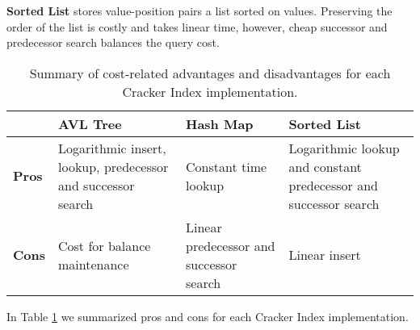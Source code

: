 \textbf{Sorted List} stores value-position pairs a list sorted on values. Preserving the order of the list is costly and takes linear time, however, cheap successor and predecessor search balances the query cost.

\begin{table}
\begin{tabular}{| m{2em}  | m{2cm} | m{2cm}|  m{2cm} |} 
\hline
 & \textbf{AVL Tree}& \textbf{Hash Map}&\textbf{Sorted List} \\ 
\hline
\textbf{Pros} & Logarithmic insert, lookup, predecessor and successor search & Constant time lookup & Logarithmic lookup and constant predecessor and successor search \\
\hline
\textbf{Cons} & Cost for balance maintenance & Linear predecessor and successor search & Linear insert \\
\hline
\end{tabular}
\caption{Summary of cost-related advantages and disadvantages for each Cracker Index implementation.}
\label{table:implementations}
\end{table}

In Table \ref{table:implementations} we summarized pros and cons for each Cracker Index implementation.
